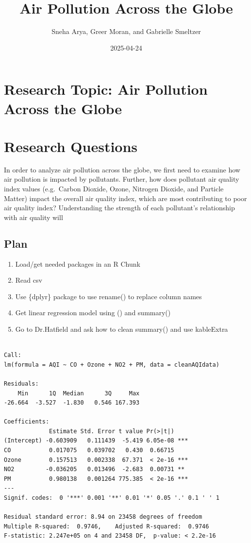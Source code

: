 \documentclass[
  letterpaper,
  DIV=11,
  numbers=noendperiod]{scrartcl}
\title{Air Pollution Across the Globe}
\author{Sneha Arya, Greer Moran, and Gabrielle Smeltzer}
\date{2025-04-24}
\providecommand{\tightlist}{%
  \setlength{\itemsep}{0pt}\setlength{\parskip}{0pt}}
\begin{document}
\maketitle


\section{\texorpdfstring{\textbf{Research Topic: Air Pollution Across
the
Globe}}{Research Topic: Air Pollution Across the Globe}}\label{research-topic-air-pollution-across-the-globe}

\section{\texorpdfstring{\textbf{Research
Questions}}{Research Questions}}\label{research-questions}

In order to analyze air pollution across the globe, we first need to
examine how air pollution is impacted by pollutants. Further, how does
pollutant air quality index values (e.g.~Carbon Dioxide, Ozone, Nitrogen
Dioxide, and Particle Matter) impact the overall air quality index,
which are most contributing to poor air quality index? Understanding the
strength of each pollutant's relationship with air quality will

\subsection{Plan}\label{plan}

\begin{enumerate}
\def\labelenumi{\arabic{enumi}.}
\tightlist
\item
  Load/get needed packages in an R Chunk
\item
  Read csv
\item
  Use \{dplyr\} package to use rename() to replace column names
\item
  Get linear regression model using () and summary()
\item
  Go to Dr.Hatfield and ask how to clean summary() and use kableExtra
\end{enumerate}

\begin{verbatim}

Call:
lm(formula = AQI ~ CO + Ozone + NO2 + PM, data = cleanAQIdata)

Residuals:
    Min      1Q  Median      3Q     Max 
-26.664  -3.527  -1.830   0.546 167.393 

Coefficients:
             Estimate Std. Error t value Pr(>|t|)    
(Intercept) -0.603909   0.111439  -5.419 6.05e-08 ***
CO           0.017075   0.039702   0.430  0.66715    
Ozone        0.157513   0.002338  67.371  < 2e-16 ***
NO2         -0.036205   0.013496  -2.683  0.00731 ** 
PM           0.980138   0.001264 775.385  < 2e-16 ***
---
Signif. codes:  0 '***' 0.001 '**' 0.01 '*' 0.05 '.' 0.1 ' ' 1

Residual standard error: 8.94 on 23458 degrees of freedom
Multiple R-squared:  0.9746,    Adjusted R-squared:  0.9746 
F-statistic: 2.247e+05 on 4 and 23458 DF,  p-value: < 2.2e-16
\end{verbatim}
\end{document}
